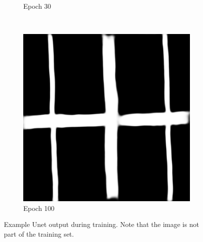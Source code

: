\documentclass[10pt,conference,compsocconf]{IEEEtran}
\begin{document}
\begin{figure}[!h]
\begin{subfigure}[b]{0.12\textwidth}
 		\caption{Epoch 30}
 	\end{subfigure}
  	~ %
  	\begin{subfigure}[b]{0.12\textwidth}
  		\includegraphics[width=\textwidth]{ep100.png}
  		\caption{Epoch 100}
  	\end{subfigure}
 	\caption{Example Unet output during training. Note that the image is not part of the training set.}\label{steps}
 \end{figure}
\end{document}
